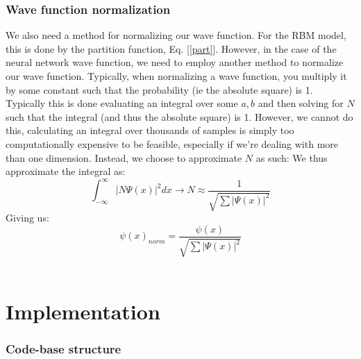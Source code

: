 \documentclass[12pt]{article}
\begin{document}
{\section{Wave function normalization}
We also need a method for normalizing our wave function. For the RBM model, this is done by the partition function, Eq. [\ref{part}]. However, in the case of the neural network wave function, we need to employ another method to normalize our wave function.\newline
Typically, when normalizing a wave function, you multiply it by some constant such that the probability (ie the absolute square) is 1. Typically this is done evaluating an integral over some $a, b$ and then solving for $N$ such that the integral (and thus the absolute square) is 1. \newline
However, we cannot do this, calculating an integral over thousands of samples is simply too computationally expensive to be feasible, especially if we're dealing with more than one dimension. \newline
Instead, we choose to approximate $N$ as such: \newline
We thus approximate the integral as:
\begin{equation*}
    \int_{-\infty}^\infty | N\Psi(x)|^2 dx \xrightarrow[]{} N \approx \frac{1}{\sqrt{\sum |\Psi(x)|^2}}
\end{equation*}
Giving us:
\begin{equation*}
    \psi(x)_{norm} = \frac{\psi(x)}{\sqrt{\sum |\Psi(x)|^2}}
\end{equation*}
\newpage
~\newpage
\part{Implementation}
\section{Code-base structure}
}
\end{document}
